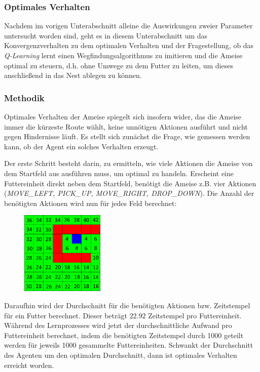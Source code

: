 \subsubsection{Optimales Verhalten}\label{sec:optimalesVerhalten}
Nachdem im vorigen Unterabschnitt alleine die Auswirkungen zweier Parameter untersucht worden sind, geht es in diesem Unterabschnitt um das Konvergenzverhalten zu dem optimalen Verhalten und der Fragestellung, ob das \textit{Q-Learning} lernt einen Wegfindungsalgorithmus zu imitieren und die Ameise optimal zu steuern, d.h. ohne Umwege zu dem Futter zu leiten, um dieses anschließend in das Nest ablegen zu können.

\subsubsection*{Methodik}
Optimales Verhalten der Ameise spiegelt sich insofern wider, das die Ameise immer die kürzeste Route wählt, keine unnötigen Aktionen ausführt und nicht gegen Hindernisse läuft. Es stellt sich zunächst die Frage, wie gemessen werden kann, ob der Agent ein solches Verhalten erzeugt. 
\par 
Der erste Schritt besteht darin, zu ermitteln, wie viele Aktionen die Ameise von dem Startfeld aus ausführen muss, um optimal zu handeln. Erscheint eine Futtereinheit direkt neben dem Startfeld, benötigt die Ameise z.B. vier Aktionen (\textit{MOVE\_LEFT, PICK\_UP, MOVE\_RIGHT, DROP\_DOWN}). Die Anzahl der benötigten Aktionen wird nun für jedes Feld berechnet:
\begin{figure}[H]
    \centering
    \includegraphics[width=150px]{images/NeededTimestampsFromEverywhere}
    \label{fig:test1}
\end{figure}
Daraufhin wird der Durchschnitt für die benötigten Aktionen bzw. Zeitstempel für ein Futter berechnet. Dieser beträgt $22.92$ Zeitstempel pro Futtereinheit. Während des Lernprozesses wird jetzt der durchschnittliche Aufwand pro Futtereinheit berechnet, indem die benötigten Zeitstempel durch 1000 geteilt werden für jeweils 1000 gesammelte Futtereinheiten. Schwankt der Durchschnitt des Agenten um den optimalen Durchschnitt, dann ist optimales Verhalten erreicht worden.

